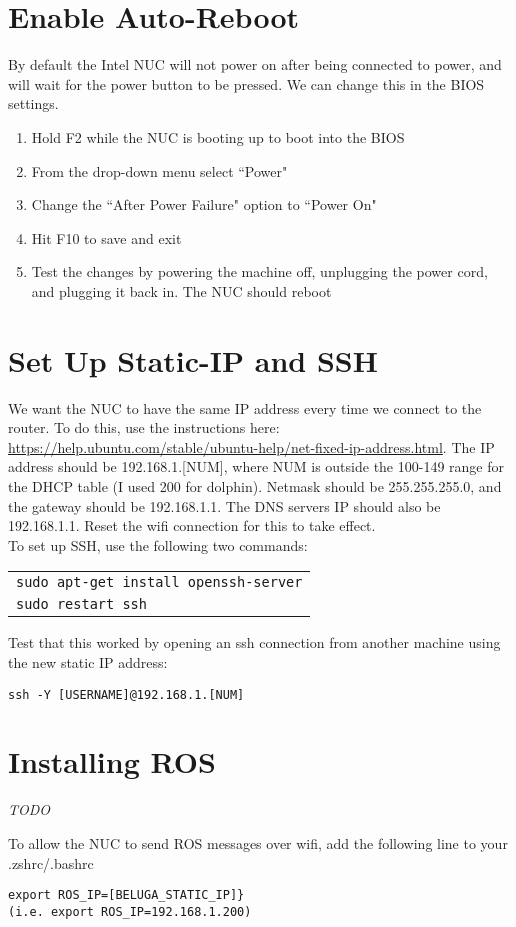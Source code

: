 \documentclass{article}
\newcommand{\todo}{ \begin{center} \large \emph{TODO} \end{center}}
\begin{document}
\section*{Enable Auto-Reboot}
By default the Intel NUC will not power on after being connected to power, and will wait for the power button to be pressed.
We can change this in the BIOS settings.
\begin{enumerate}[nosep]
\item Hold F2 while the NUC is booting up to boot into the BIOS
\item From the drop-down menu select ``Power"
\item Change the ``After Power Failure" option to ``Power On"
\item Hit F10 to save and exit
\item Test the changes by powering the machine off, unplugging the power cord, and plugging it back in. The NUC should reboot
\end{enumerate}

\section*{Set Up Static-IP and SSH}
We want the NUC to have the same IP address every time we connect to the router.
To do this, use the instructions here: \url{https://help.ubuntu.com/stable/ubuntu-help/net-fixed-ip-address.html}.
The IP address should be 192.168.1.[NUM], where NUM is outside the 100-149 range for the DHCP table (I used 200 for dolphin).
Netmask should be 255.255.255.0, and the gateway should be 192.168.1.1.
The DNS servers IP should also be 192.168.1.1.
Reset the wifi connection for this to take effect.\\

To set up SSH, use the following two commands:
\begin{center}
\begin{tabular}{l}
\texttt{sudo apt-get install openssh-server} \\
\texttt{sudo restart ssh}
\end{tabular}
\end{center}
Test that this worked by opening an ssh connection from another machine using the new static IP address:
\begin{center}
\texttt{ssh -Y [USERNAME]@192.168.1.[NUM]}
\end{center}

\section*{Installing ROS}
\todo
To allow the NUC to send ROS messages over wifi, add the following line to your .zshrc/.bashrc \begin{verbatim}
export ROS_IP=[BELUGA_STATIC_IP]}
(i.e. export ROS_IP=192.168.1.200)
\end{verbatim}
\end{document}
